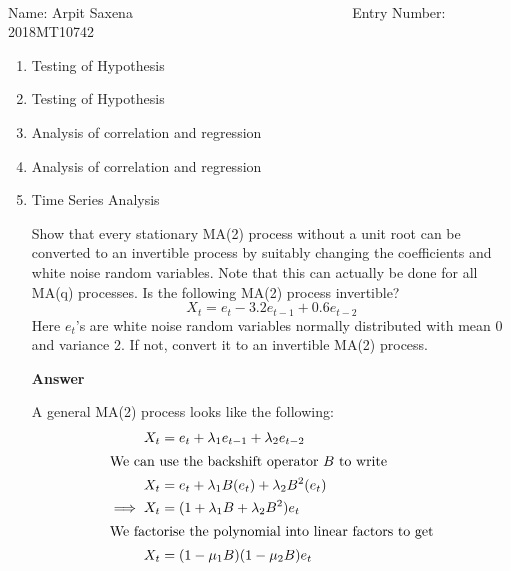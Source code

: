 \documentclass[12pt, oneside]{article}
\begin{document}
\setlength{\textheight}{8.5in}
\\





\vskip 0.5cm

\noindent Name: Arpit Saxena ~~~  ~~~~~ ~~~~ ~~~~~~~~~~~~~~~~ Entry Number: 2018MT10742 ~~~~~~~~~~~



\vskip 0.5cm



\begin{enumerate}
	



\item	Testing of Hypothesis


\item	 Testing of Hypothesis


\item	Analysis of correlation and regression 



\item	Analysis of correlation and regression 


\item {
    Time Series Analysis

    Show that every stationary MA(2) process without a unit root can be converted to an invertible
    process by suitably changing the coefficients and white noise random variables.
    Note that this can actually be done for all MA(q) processes. Is the following
    MA(2) process invertible?
    \[X_t = e_t - 3.2 e_{t-1} + 0.6 e_{t-2}\]
    Here \(e_t\)'s are white noise random variables normally distributed with mean
    0 and variance 2. If not, convert it to an invertible MA(2) process.

    \textbf{Answer}

    A general MA(2) process looks like the following:
    \begin{align*}
        X_t &= e_t + \lambda_1 e_{t-1} + \lambda_2 e_{t-2} \\
        \intertext{We can use the backshift operator \(B\) to write}
        X_t &= e_t + \lambda_1 B(e_{t}) + \lambda_2 B^2(e_{t}) \\
        \implies X_t &= (1 + \lambda_1 B + \lambda_2 B^2) e_{t} \\
        \intertext{We factorise the polynomial into linear factors to get}
        X_t &= (1 - \mu_1 B)(1 - \mu_2 B) e_t
    \end{align*}

}
\end{enumerate}
\end{document}
